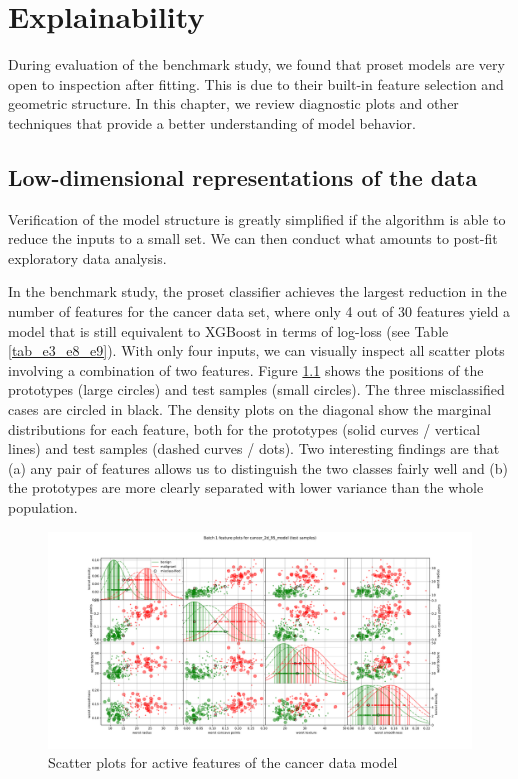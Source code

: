 \chapter{Explainability}
\label{ch_explainability}
%
During evaluation of the benchmark study, we found that proset models are very open to inspection after fitting.
This is due to their built-in feature selection and geometric structure.
In this chapter, we review diagnostic plots and other techniques that provide a better understanding of model behavior.
%
\section{Low-dimensional representations of the data}
\label{sec_low_dimensional}
%
Verification of the model structure is greatly simplified if the algorithm is able to reduce the inputs to a small set.
We can then conduct what amounts to post-fit exploratory data analysis.\par
%
In the benchmark study, the proset classifier achieves the largest reduction in the number of features for the cancer data set, where only 4 out of 30 features yield a model that is still equivalent to XGBoost in terms of log-loss (see Table \ref{tab_e3_e8_e9}).
With only four inputs, we can visually inspect all scatter plots involving a combination of two features.
Figure \ref{fig_scatter_plots_cancer} shows the positions of the prototypes (large circles) and test samples (small circles).
The three misclassified cases are circled in black.
The density plots on the diagonal show the marginal distributions for each feature, both for the prototypes (solid curves / vertical lines) and test samples (dashed curves / dots).
Two interesting findings are that (a) any pair of features allows us to distinguish the two classes fairly well and (b) the prototypes are more clearly separated with lower variance than the whole population.\par
%
\begin{figure}
\caption{Scatter plots for active features of the cancer data model}
\label{fig_scatter_plots_cancer}
%
\begin{center}
\includegraphics[width=0.9\textheight, angle=90, trim={1.5cm 1.5cm 1.5cm 0.5cm}, clip]{figures/cancer_scatter_plot_testing_data.pdf}
\end{center}
\end{figure}
